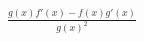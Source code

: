 \documentclass[preview]{standalone}
\begin{document}
\begin{align*}
\frac{g(x)f'(x)-f(x)g'(x)}{g(x)^2}
\end{align*}
\end{document}
